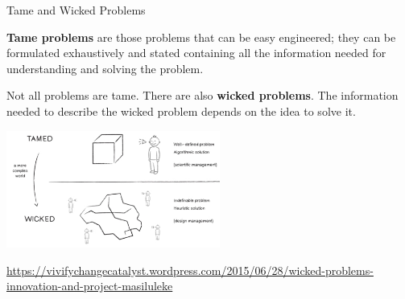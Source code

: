 \documentclass{beamer}
\begin{document}
\begin{frame}{\centerline{Tame and Wicked Problems}}
\begin{small}
\textbf{Tame problems} are those problems that can be easy engineered; they can be formulated exhaustively and stated containing all the information needed for understanding and solving the problem.

Not all problems are tame. There are also \textbf{wicked problems}. The information needed to describe the wicked problem depends on the idea to solve it.

\begin{center}
\includegraphics[width=70mm]{A2022.IDSEPC.ProcessoDiProduzione/pic-03.png}
\end{center}

\end{small}

\begin{center}
\tiny
\url{https://vivifychangecatalyst.wordpress.com/2015/06/28/wicked-problems-innovation-and-project-masiluleke}

\end{center}


\end{frame}

\end{document}
